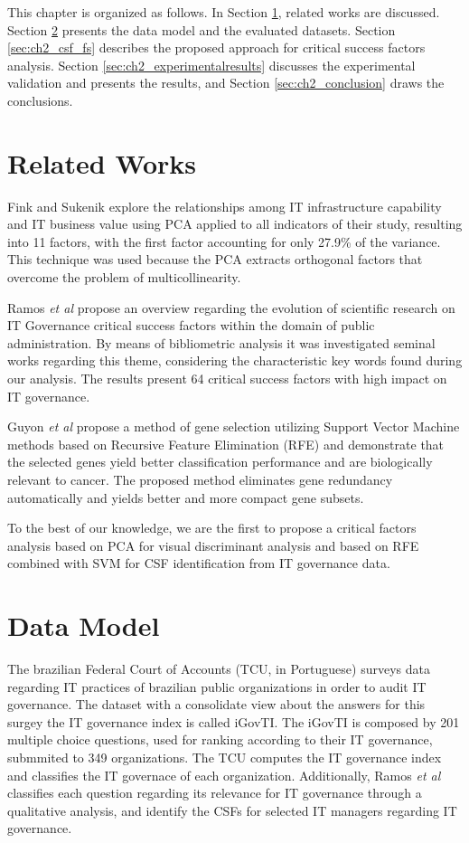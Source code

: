 This chapter is organized as follows. In Section \ref{sec:ch2_relatedworks}, related works are discussed. Section \ref{sec:ch2_datamodel} presents the data model and the evaluated datasets. Section \ref{sec:ch2_csf_fs} describes the proposed approach for critical success factors analysis. Section \ref{sec:ch2_experimentalresults} discusses the experimental validation and presents the results, and Section \ref{sec:ch2_conclusion} draws the conclusions.

\section{Related Works}
\label{sec:ch2_relatedworks}

Fink and Sukenik \cite{fink2011effect} explore the relationships among IT infrastructure capability and IT business value using PCA applied to all indicators of their study, resulting into 11 factors, with the first factor accounting for only 27.9\% of the variance. This technique was used because the PCA extracts orthogonal factors that overcome the problem of multicollinearity.

Ramos \emph{et al} \cite{ramos2016information} propose an overview regarding the evolution of scientific research on IT Governance critical success factors within the domain of public administration. By means of bibliometric analysis it was investigated seminal works regarding this theme, considering the characteristic key words found during our analysis. The results present 64 critical success factors with high impact on IT governance.

Guyon \emph{et al} \cite{guyon2002gene} propose a method of gene selection utilizing Support Vector Machine methods based on Recursive Feature Elimination (RFE) and demonstrate that the selected genes yield better classification performance and are biologically relevant to cancer.  The proposed method eliminates gene redundancy automatically and yields better and more compact gene subsets. 

To the best of our knowledge, we are the first to propose a critical factors analysis based on PCA for visual discriminant analysis and based on RFE combined with SVM for CSF identification from IT governance data.

\section{Data Model}
\label{sec:ch2_datamodel}

The brazilian Federal Court of Accounts (TCU, in Portuguese) surveys data regarding IT practices of brazilian public organizations in order to audit IT governance. The dataset with a consolidate view about the answers for this surgey the IT governance index is called iGovTI. The iGovTI is composed by 201 multiple choice questions, used for ranking according to their IT governance, submmited to 349 organizations. The TCU computes the IT governance index and classifies the IT governace of each organization. Additionally, Ramos \emph{et al} \cite{ramos2016information} classifies each question regarding its relevance for IT governance through a qualitative analysis, and identify the CSFs for selected IT managers regarding IT governance.

